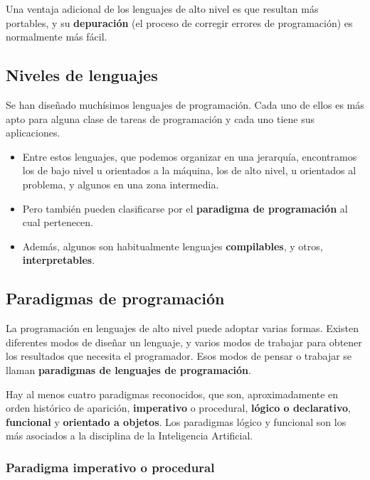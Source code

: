 \documentclass[spanish,A4,]{article}
\begin{document}
Una ventaja adicional de los lenguajes de alto nivel es que resultan más
portables, y su \textbf{depuración} (el proceso de corregir errores de
programación) es normalmente más fácil.

\subsection{Niveles de lenguajes}\label{niveles-de-lenguajes}

Se han diseñado muchísimos lenguajes de programación. Cada uno de ellos
es más apto para alguna clase de tareas de programación y cada uno tiene
sus aplicaciones.

\begin{itemize}
\itemsep1pt\parskip0pt
\item
  Entre estos lenguajes, que podemos organizar en una jerarquía,
  encontramos los de bajo nivel u orientados a la máquina, los de alto
  nivel, u orientados al problema, y algunos en una zona intermedia.
\item
  Pero también pueden clasificarse por el \textbf{paradigma de
  programación} al cual pertenecen.
\item
  Además, algunos son habitualmente lenguajes \textbf{compilables}, y
  otros, \textbf{interpretables}.
\end{itemize}

\subsection{Paradigmas de
programación}\label{paradigmas-de-programaciuxf3n}

La programación en lenguajes de alto nivel puede adoptar varias formas.
Existen diferentes modos de diseñar un lenguaje, y varios modos de
trabajar para obtener los resultados que necesita el programador. Esos
modos de pensar o trabajar se llaman \textbf{paradigmas de lenguajes de
programación}.

Hay al menos cuatro paradigmas reconocidos, que son, aproximadamente en
orden histórico de aparición, \textbf{imperativo} o procedural,
\textbf{lógico o declarativo}, \textbf{funcional} y \textbf{orientado a
objetos}. Los paradigmas lógico y funcional son los más asociados a la
disciplina de la Inteligencia Artificial.

\subsubsection{Paradigma imperativo o
procedural}\label{paradigma-imperativo-o-procedural}
\end{document}
